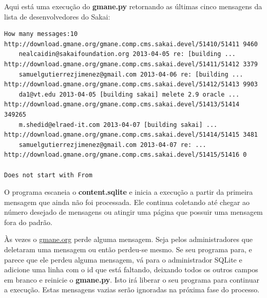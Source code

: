 Aqui está uma execução do {\bf gmane.py} retornando as últimas cinco 
mensagens da lista de desenvolvedores do Sakai:

\beforeverb
\begin{verbatim}
How many messages:10
http://download.gmane.org/gmane.comp.cms.sakai.devel/51410/51411 9460
    nealcaidin@sakaifoundation.org 2013-04-05 re: [building ...
http://download.gmane.org/gmane.comp.cms.sakai.devel/51411/51412 3379
    samuelgutierrezjimenez@gmail.com 2013-04-06 re: [building ...
http://download.gmane.org/gmane.comp.cms.sakai.devel/51412/51413 9903
    da1@vt.edu 2013-04-05 [building sakai] melete 2.9 oracle ...
http://download.gmane.org/gmane.comp.cms.sakai.devel/51413/51414 349265
    m.shedid@elraed-it.com 2013-04-07 [building sakai] ...
http://download.gmane.org/gmane.comp.cms.sakai.devel/51414/51415 3481
    samuelgutierrezjimenez@gmail.com 2013-04-07 re: ...
http://download.gmane.org/gmane.comp.cms.sakai.devel/51415/51416 0

Does not start with From 
\end{verbatim}
\afterverb
%

O programa escaneia o {\bf content.sqlite} e inicia a execução a partir da primeira
mensagem que ainda não foi processada. Ele continua coletando até chegar ao número
desejado de mensagens ou atingir uma página que possuir uma mensagem fora do padrão.

Às vezes o \url{gmane.org} perde alguma mensagem. Seja pelos administradores que deletaram
uma mensagem ou então perdeu-se mesmo. Se seu programa para, e parece que ele perdeu alguma 
mensagem, vá para o administrador SQLite e adicione uma linha com o id que está faltando,
deixando todos os outros campos em branco e reinicie o {\bf gmane.py}. Isto irá liberar o 
seu programa para continuar a execução. Estas mensagens vazias serão ignoradas na próxima 
fase do processo.

